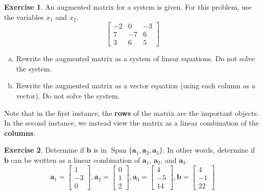 \documentclass[10pt]{book}
\theoremstyle{definition}
\newtheorem{exercise}{Exercise}[section]
\newcommand{\vect}[1]{\ensuremath{\boldsymbol{\mathbf{#1}}}}
\DeclareMathOperator{\Span}{Span}
\begin{document}
\begin{exercise} %
	An augmented matrix for a system is given. For this problem, use the variables $x_1$ and $x_2$.
	$$\begin{bmatrix}
	-2 & 0 & -3 \\ 7 & -7 & 6 \\ 3 & 6 & 5
	\end{bmatrix}$$
	\begin{multicols}{2}
		\begin{enumerate}[(a)]
			\item Rewrite the augmented matrix as a system of linear equations. Do not solve the system.
			\item Rewrite the augmented matrix as a vector equation (using each column as a vector). Do not solve the system.
		\end{enumerate}
	\end{multicols}
	\vfill
	Note that in the first instance, the \textbf{rows} of the matrix are the important objects. In the second instance, we instead view the matrix as a linear combination of the \textbf{columns}.
\end{exercise}


\newpage


\begin{exercise} %
	Determine if $\vect{b}$ is in $\Span\{\vect{a}_1, \vect{a}_2, \vect{a}_3\}$. In other words, determine if $\vect{b}$ can be written as a linear combination of $\vect{a}_1$, $\vect{a}_2$, and $\vect{a}_3$.
	$$ \vect{a}_1 = \begin{bmatrix} 1 \\ -3 \\ 0 \end{bmatrix}, 
	\vect{a}_2 = \begin{bmatrix} 0 \\ 1 \\ 2 \end{bmatrix}, 
	\vect{a}_3 = \begin{bmatrix} 4 \\ -5 \\ 14 \end{bmatrix},
	\vect{b} = \begin{bmatrix} 4 \\ -1 \\ 22 \end{bmatrix}$$
\end{exercise}
\vfill
\end{document}

